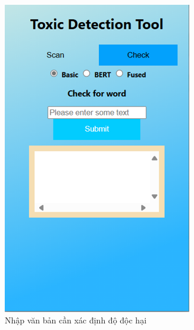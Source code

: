 \begin{figure}[htb!]
\begin{subfigure}[b]{0.33\textwidth}
        \includegraphics[width=0.9\textwidth]{image/ex_text_enter.png}
        \caption{Nhập văn bản cần xác định độ độc hại}
        \label{figure:ex_text_enter}
    \end{subfigure}%
    \begin{subfigure}[b]{0.33\textwidth}
        \centering

\end{subfigure}
\end{figure}
